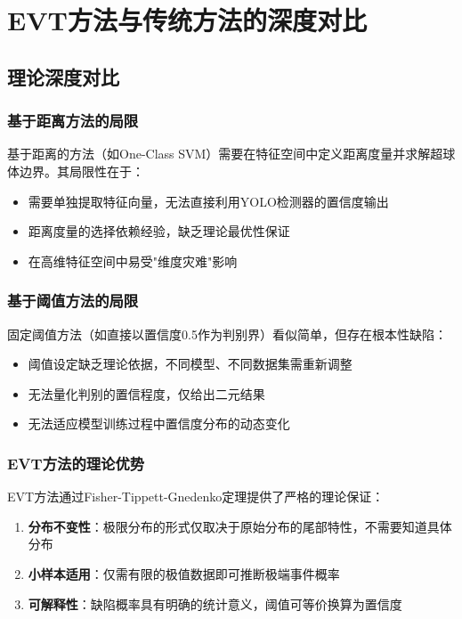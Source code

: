\documentclass[12pt,a4paper]{ctexart}
\theoremstyle{cumcm}
\begin{document}
\section{EVT方法与传统方法的深度对比}

\subsection{理论深度对比}

\subsubsection{基于距离方法的局限}

基于距离的方法（如One-Class SVM）需要在特征空间中定义距离度量并求解超球体边界。其局限性在于：
\begin{itemize}
\item 需要单独提取特征向量，无法直接利用YOLO检测器的置信度输出
\item 距离度量的选择依赖经验，缺乏理论最优性保证
\item 在高维特征空间中易受"维度灾难"影响
\end{itemize}

\subsubsection{基于阈值方法的局限}

固定阈值方法（如直接以置信度0.5作为判别界）看似简单，但存在根本性缺陷：
\begin{itemize}
\item 阈值设定缺乏理论依据，不同模型、不同数据集需重新调整
\item 无法量化判别的置信程度，仅给出二元结果
\item 无法适应模型训练过程中置信度分布的动态变化
\end{itemize}

\subsubsection{EVT方法的理论优势}

EVT方法通过Fisher-Tippett-Gnedenko定理提供了严格的理论保证：
\begin{enumerate}[leftmargin=2.2em,itemsep=2pt]
\item \textbf{分布不变性}：极限分布的形式仅取决于原始分布的尾部特性，不需要知道具体分布
\item \textbf{小样本适用}：仅需有限的极值数据即可推断极端事件概率
\item \textbf{可解释性}：缺陷概率具有明确的统计意义，阈值可等价换算为置信度
\end{enumerate}
\end{document}
